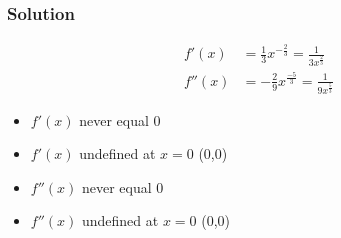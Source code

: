 \documentclass{article}
\begin{document}
\subsubsection*{Solution}
\begin{align*}
    f'(x)&=\frac{1}{3}x^{-\frac{2}{3}} = \frac{1}{3x^{\frac{2}{3}}}\\
    f''(x)&=-\frac{2}{9}x^{\frac{-5}{3}}=\frac{1}{9x^{\frac{5}{3}}}
\end{align*}
\begin{itemize}
    \item $f'(x)$ never equal 0
    \item $f'(x)$ undefined at $x=0$ (0,0)
    \item $f''(x)$ never equal 0
    \item $f''(x)$ undefined at $x=0$ (0,0)
\end{itemize}
\end{document}

